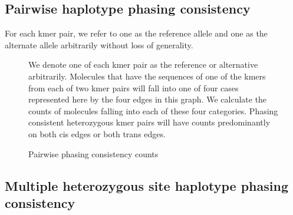 \subsection{Pairwise haplotype phasing consistency}
\par{
For each kmer pair, we refer to one as the reference allele and one as the alternate allele arbitrarily without loss of generality. 
}


\begin{figure}[htbp!]
\caption{Pairwise phasing consistency counts}\label{figure:consistency}
\centering
{}
\par{
We denote one of each kmer pair as the reference or alternative arbitrarily. Molecules that have the sequences of one of the kmers from each of two kmer pairs will fall into one of four cases represented here by the four edges in this graph. We calculate the counts of molecules falling into each of these four categories. Phasing consistent heterozygous kmer pairs will have counts predominantly on both cis edges or both trans edges.
}
\end{figure}

\subsection{Multiple heterozygous site haplotype phasing consistency}



